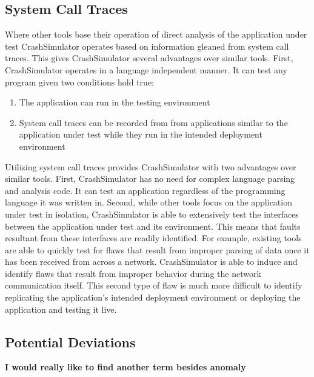     \subsection{System Call Traces}

        Where other tools base their operation of direct analysis of the application under test CrashSimulator operates
        based on information gleaned from system call traces. This gives CrashSimulator several advantages over similar
        tools. First, CrashSimulator operates in a language independent manner. It can test any program given two
        conditions hold true:

        \begin{enumerate}
            \item{The application can run in the testing environment}
            \item{System call traces can be recorded from from applications similar to the application under test while
                they run in the intended deployment environment}
        \end{enumerate}

        Utilizing system call traces provides CrashSimulator with two advantages over similar tools. First,
        CrashSimulator has no need for complex language parsing and analysis code. It can test an application regardless
        of the programming language it was written in. Second, while other tools focus on the application under test in
        isolation, CrashSimulator is able to extensively test the interfaces between the application under test and its
        environment. This means that faults resultant from these interfaces are readily identified. For example,
        existing tools are able to quickly test for flaws that result from improper parsing of data once it
        has been received from across a network. CrashSimulator is able to induce and identify flaws that result from
        improper behavior during the network communication itself. This second type of flaw is much more difficult to
        identify replicating the application's intended deployment environment or deploying the application and testing
        it live.


    \subsection{Potential Deviations}

        \textbf{I would really like to find another term besides anomaly}

